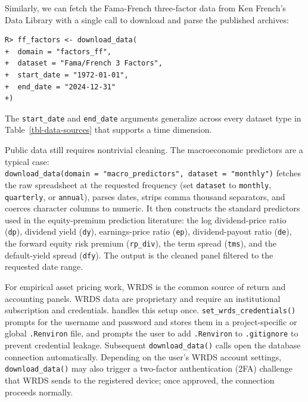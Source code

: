 \documentclass[
  article]{jss}
\begin{document}
Similarly, we can fetch the Fama-French three-factor data from Ken
French's Data Library with a single call to download and parse the
published archives:

\begin{verbatim}
R> ff_factors <- download_data(
+  domain = "factors_ff",
+  dataset = "Fama/French 3 Factors",
+  start_date = "1972-01-01",
+  end_date = "2024-12-31"
+)
\end{verbatim}

The \texttt{start\_date} and \texttt{end\_date} arguments generalize
across every dataset type in Table~\ref{tbl-data-sources} that supports
a time dimension.

Public data still requires nontrivial cleaning. The \citet{goyal.2008}
macroeconomic predictors are a typical case:
\texttt{download\_data(domain\ =\ "macro\_predictors",\ dataset\ =\ "monthly")}
fetches the raw spreadsheet at the requested frequency (set
\texttt{dataset} to \texttt{monthly}, \texttt{quarterly}, or
\texttt{annual}), parses dates, strips comma thousand separators, and
coerces character columns to numeric. It then constructs the standard
predictors used in the equity-premium prediction literature: the log
dividend-price ratio (\texttt{dp}), dividend yield (\texttt{dy}),
earnings-price ratio (\texttt{ep}), dividend-payout ratio (\texttt{de}),
the forward equity risk premium (\texttt{rp\_div}), the term spread
(\texttt{tms}), and the default-yield spread (\texttt{dfy}). The output
is the cleaned panel filtered to the requested date range.

For empirical asset pricing work, WRDS is the common source of return
and accounting panels. WRDS data are proprietary and require an
institutional subscription and credentials.  handles
this setup once. \texttt{set\_wrds\_credentials()} prompts for the
username and password and stores them in a project-specific or global
\texttt{.Renviron} file, and prompts the user to add \texttt{.Renviron}
to \texttt{.gitignore} to prevent credential leakage. Subsequent
\texttt{download\_data()} calls open the database connection
automatically. Depending on the user's WRDS account settings,
\texttt{download\_data()} may also trigger a two-factor authentication
(2FA) challenge that WRDS sends to the registered device; once approved,
the connection proceeds normally.
\end{document}
